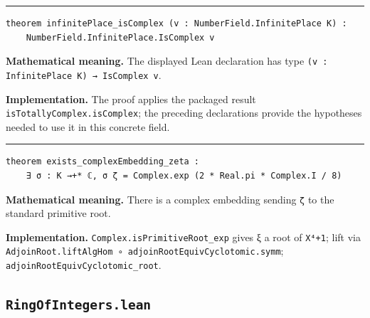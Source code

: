 \documentclass[UTF8,a4paper,11pt,fontset=fandol]{ctexart}
\theoremstyle{definition}
\newcommand{\statementsep}{\par\medskip\hrule\medskip}
\begin{document}
\statementsep
\begin{verbatim}
theorem infinitePlace_isComplex (v : NumberField.InfinitePlace K) :
    NumberField.InfinitePlace.IsComplex v
\end{verbatim}
\noindent\textbf{Mathematical meaning.} The displayed Lean declaration has type \texttt{(v : InfinitePlace K) → IsComplex v}.\par
\noindent\textbf{Implementation.} The proof applies the packaged result \texttt{isTotallyComplex.\allowbreak{}isComplex}; the preceding declarations provide the hypotheses needed to use it in this concrete field.\par
\statementsep
\begin{verbatim}
theorem exists_complexEmbedding_zeta :
    ∃ σ : K →+* ℂ, σ ζ = Complex.exp (2 * Real.pi * Complex.I / 8)
\end{verbatim}
\noindent\textbf{Mathematical meaning.} There is a complex embedding sending \texttt{ζ} to the standard primitive root.\par
\noindent\textbf{Implementation.} \texttt{Complex.\allowbreak{}isPrimitiveRoot\_\allowbreak{}exp} gives ξ a root of \texttt{X⁴+1}; lift via \texttt{AdjoinRoot.\allowbreak{}liftAlgHom ∘ adjoinRootEquivCyclotomic.\allowbreak{}symm}; \texttt{adjoinRootEquivCyclotomic\_\allowbreak{}root}.\par

\subsection{\texttt{RingOfIntegers.lean}}
\end{document}

